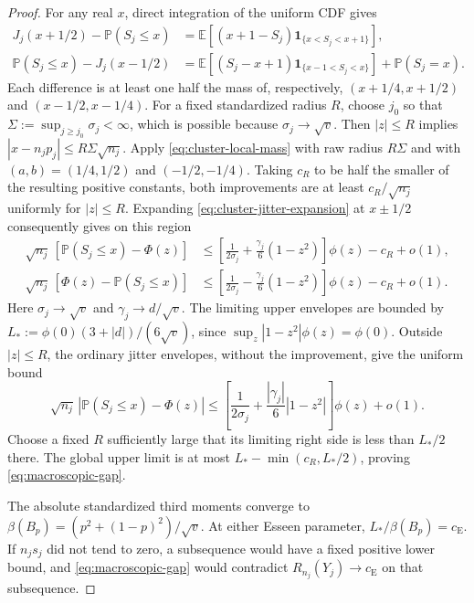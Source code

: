 \documentclass[aop]{imsart}
\theoremstyle{plain}
\theoremstyle{definition}
\theoremstyle{definition}
\newcommand{\PP}{\mathbb P}
\newcommand{\EE}{\mathbb E}
\newcommand{\ce}{c_{\mathrm E}}
\newcommand{\ind}{\mathbf 1}
\begin{document}
\begin{proof}
For any real $x$, direct integration of the uniform CDF gives
\begin{align*}
 J_j(x+1/2)-\PP(S_j\le x)
 &=\EE[(x+1-S_j)\ind_{\{x<S_j<x+1\}}],\\
 \PP(S_j\le x)-J_j(x-1/2)
 &=\EE[(S_j-x+1)\ind_{\{x-1<S_j<x\}}]+\PP(S_j=x).
\end{align*}
Each difference is at least one half the mass of, respectively,
$(x+1/4,x+1/2)$ and $(x-1/2,x-1/4)$.
For a fixed standardized radius $R$, choose $j_0$ so that
$\Sigma:=\sup_{j\ge j_0}\sigma_j<\infty$, which is possible because
$\sigma_j\to\sqrt v$. Then $|z|\le R$ implies
$|x-n_jp_j|\le R\Sigma\sqrt{n_j}$.
Apply \eqref{eq:cluster-local-mass} with raw radius $R\Sigma$ and
with $(a,b)=(1/4,1/2)$ and $(-1/2,-1/4)$.
Taking $c_R$ to be half the smaller of the resulting positive constants,
both improvements are at least $c_R/\sqrt{n_j}$ uniformly for
$|z|\le R$. Expanding \eqref{eq:cluster-jitter-expansion} at $x\pm1/2$ consequently
gives on this region
\begin{align*}
 \sqrt{n_j}\,[\PP(S_j\le x)-\Phi(z)]
 &\le\left[\frac1{2\sigma_j}
          +\frac{\gamma_j}{6}(1-z^2)\right]\phi(z)-c_R+o(1),\\
 \sqrt{n_j}\,[\Phi(z)-\PP(S_j\le x)]
 &\le\left[\frac1{2\sigma_j}
          -\frac{\gamma_j}{6}(1-z^2)\right]\phi(z)-c_R+o(1).
\end{align*}
Here $\sigma_j\to\sqrt v$ and $\gamma_j\to d/\sqrt v$.
The limiting upper envelopes are bounded by
$L_*:=\phi(0)(3+|d|)/(6\sqrt v)$, since
$\sup_z|1-z^2|\phi(z)=\phi(0)$. Outside $|z|\le R$, the ordinary
jitter envelopes, without the improvement, give the uniform bound
\[
 \sqrt{n_j}\,|\PP(S_j\le x)-\Phi(z)|
 \le\left[\frac1{2\sigma_j}
       +\frac{|\gamma_j|}{6}|1-z^2|\right]\phi(z)+o(1).
\]
Choose a fixed $R$ sufficiently large that its limiting right side is
less than $L_*/2$ there. The global upper limit is at most
$L_*-\min(c_R,L_*/2)$, proving \eqref{eq:macroscopic-gap}.

The absolute standardized third moments converge to
$\beta(B_p)=(p^2+(1-p)^2)/\sqrt v$. At either Esseen parameter,
$L_*/\beta(B_p)=\ce$. If $n_js_j$ did not tend to zero, a subsequence
would have a fixed positive lower bound, and
\eqref{eq:macroscopic-gap} would contradict
$R_{n_j}(Y_j)\to\ce$ on that subsequence.
\end{proof}
\end{document}
